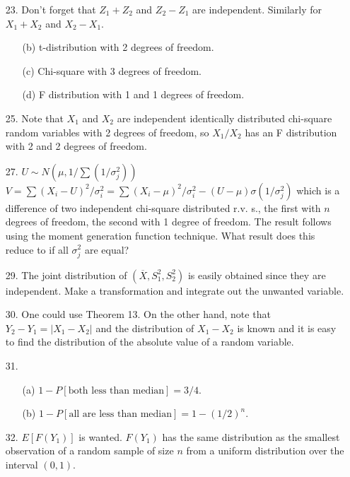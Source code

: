 \begin{enumerate}
	\newpage

	\item[23.] Don't forget that $Z_1+Z_2$ and $Z_2-Z_1$ are independent.  Similarly for $X_1+X_2$ and $X_2-X_1$.
	\begin{enumerate}
		\item[(b)] t-distribution with 2 degrees of freedom.
		\item[(c)] Chi-square with 3 degrees of freedom.
		\item[(d)] F distribution with 1 and 1 degrees of freedom.
	\end{enumerate}

	\item[25.] Note that $X_1$ and $X_2$ are independent identically distributed chi-square random variables with 2 degrees of freedom, so $X_1/X_2$ has an F distribution with 2 and 2 degrees of freedom.

	\item[27.] $U\sim N(\mu, 1/\sum(1/\sigma_j^2))$ \\
	$V = \sum(X_i-U)^2/\sigma_i^2 = \sum(X_i-\mu)^2/\sigma_i^2 - (U-\mu)\sigma(1/\sigma_j^2)$ which is a difference of two independent chi-square distributed r.v.
	s., the first with $n$ degrees of freedom, the second with 1 degree of freedom.  The result follows using the moment generation function technique.  What result does this reduce to if all $\sigma_j^2$ are equal?

	\item[29.] The joint distribution of $(\overline{X}, S_1^2, S_2^2)$ is easily obtained since they are independent. Make a transformation and integrate out the unwanted variable.

	\item[30.] One could use Theorem 13. On the other hand, note that $Y_2 - Y_1 = \vert X_1 - X_2\vert$ and the distribution of $X_1 - X_2$ is known and it is easy to find the distribution of the absolute value of a random variable.

	\item[31.] \begin{enumerate}
		\item[(a)] $1 - P[\mbox{both less than median}] = 3/4$.
		\item[(b)] $1 - P[\mbox{all are less than median}] = 1 - (1/2)^n$. 
	\end{enumerate}

	\item[32.] $E[F(Y_1)]$ is wanted. $F(Y_1)$ has the same distribution as the smallest observation of a random sample of size $n$ from a uniform distribution over the interval $(0,1)$.


\end{enumerate}
